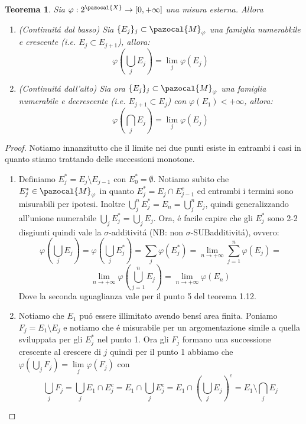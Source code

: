 \documentclass[11pt,a4paper]{report}
\theoremstyle{plain}
\newtheorem{thm}{Teorema}[chapter] %
\theoremstyle{definition}
\newcommand{\M}{\pazocal{M}_\varphi}
\newcommand{\X}{\pazocal{X}}
\begin{document}
\begin{thm}
	Sia $\varphi : 2^\X \rightarrow [0, +\infty]$ una misura esterna. Allora
	\begin{enumerate}
		\item (Continuit\'a dal basso) Sia $\{E_j\}_j \subset \M$ una famiglia numerabkile e crescente (i.e. $E_j \subset E_{j+1}$), allora:
		\[
			\varphi(\bigcup\limits_jE_j) = \lim\limits_j\varphi(E_j)		
		\]
		\item (Continuit\'a dall'alto) Sia ora $\{E_j\}_j \subset \M$ una famiglia numerabile e decrescente (i.e. $E_{j+1} \subset E_j$) con $\varphi(E_1) < +\infty$, allora:
		\[
			\varphi(\bigcap\limits_{j}E_j) = \lim\limits_j\varphi(E_j)		
		\]
	\end{enumerate}
\end{thm}
\begin{proof}
	Notiamo innanzitutto che il limite nei due punti esiste in entrambi i casi in quanto stiamo trattando delle successioni monotone.
	\begin{enumerate}
		\item Definiamo $E_j^* = E_{j} \setminus E_{j-1}$ con $E_0^* = \emptyset$.
		Notiamo subito che $E_j^* \in \M$ in quanto $E_j^* = E_{j} \cap E_{j-1}^c$ ed entrambi i termini sono misurabili per ipotesi.
		 Inoltre $\bigcup\limits_{j}^{n}E_j^* = E_n = \bigcup\limits_{j}^{n}E_j$, quindi generalizzando all'unione numerabile $\bigcup\limits_{j}E_j^* = \bigcup\limits_{j}E_j$. Ora, \'e facile capire che gli $E_j^*$ sono 2-2 disgiunti quindi vale la $\sigma$-additivit\'a (NB: non $\sigma$-SUBadditivit\'a), ovvero:
		 \[
			\varphi(\bigcup\limits_jE_j) = \varphi(\bigcup\limits_jE_j^*) = \sum\limits_{j}\varphi(E_j^*) = \lim\limits_{n\rightarrow +\infty}\sum\limits_{j=1}^{n}\varphi(E_j) = 
		 \]
		 \[
			\lim\limits_{n\rightarrow +\infty}\varphi(\bigcup\limits_{j=1}^nE_j) = \lim\limits_{n\rightarrow +\infty}\varphi(E_n)		 
		 \]
		 Dove la seconda uguaglianza vale per il punto 5 del teorema 1.12.
		 \item Notiamo che $E_1$ pu\'o essere illimitato avendo bens\'i area finita. Poniamo $F_j = E_1 \setminus E_j$ e notiamo che \'e misurabile per un argomentazione simile a quella sviluppata per gli $E_j^*$ nel punto 1. Ora gli $F_j$ formano una successione crescente al crescere di $j$ quindi per il punto 1 abbiamo che $\varphi(\bigcup\limits_{j}F_j) = \lim\limits_{j}\varphi(F_j)$ con 
		 \[\bigcup\limits_{j}F_j = \bigcup\limits_{j}E_1 \cap E_j^c = E_1 \cap \bigcup\limits_{j}E_j^c = E_1 \cap (\bigcup\limits_{j}E_j)^c = E_1 \setminus \bigcap\limits_{j}E_j\]

\end{enumerate}
\end{proof}
\end{document}
